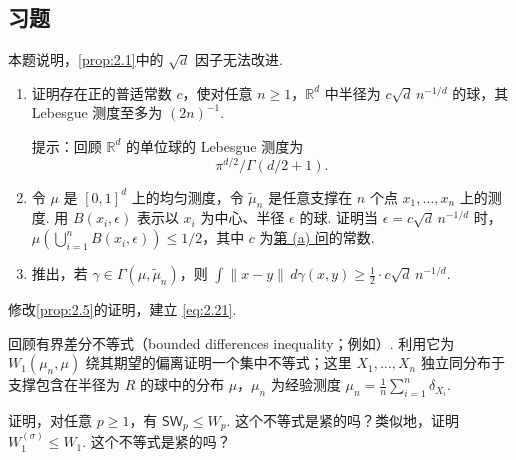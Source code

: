 \subsection{习题}\label{sec:2.10}
\begin{exercise}\label{exer:2.1}
本题说明，\autoref{prop:2.1}中的 $\sqrt d$ 因子无法改进.
\begin{enumerate}
\item[(a)]\label{item:2.1a} 证明存在正的普适常数 $c$，使对任意 $n\ge1$，$\mathbb R^d$ 中半径为 $c\sqrt d\,n^{-1/d}$ 的球，其 Lebesgue 测度至多为 $(2n)^{-1}$.
\par 提示：回顾 $\mathbb R^d$ 的单位球的 Lebesgue 测度为
$$\pi^{d/2}/\Gamma(d/2+1).$$
\item[(b)] 令 $\mu$ 是 $[0,1]^d$ 上的均匀测度，令 $\tilde\mu_n$ 是任意支撑在 $n$ 个点 $x_1,\ldots,x_n$ 上的测度. 用 $B(x_i,\epsilon)$ 表示以 $x_i$ 为中心、半径 $\epsilon$ 的球. 证明当 $\epsilon=c\sqrt d\,n^{-1/d}$ 时，$\mu(\bigcup_{i=1}^nB(x_i,\epsilon))\le1/2$，其中 $c$ 为\hyperref[item:2.1a]{第 (a) 问}的常数.
\item[(c)] 推出，若 $\gamma\in\Gamma(\mu,\tilde\mu_n)$，则 $\int\lVert x-y\rVert\,d\gamma(x,y)\ge\frac12\cdot c\sqrt d\,n^{-1/d}$.
\end{enumerate}
\end{exercise}

\begin{exercise}\label{exer:2.2}
修改\autoref{prop:2.5}的证明，建立 \eqref{eq:2.21}.
\end{exercise}

\begin{exercise}\label{exer:2.3}
回顾有界差分不等式（bounded differences inequality；例如\cite[定理6.2]{ref51}）. 利用它为 $W_1(\mu_n,\mu)$ 绕其期望的偏离证明一个集中不等式；这里 $X_1,\ldots,X_n$ 独立同分布于支撑包含在半径为 $R$ 的球中的分布 $\mu$，$\mu_n$ 为经验测度 $\mu_n=\frac1n\sum_{i=1}^n\delta_{X_i}$.
\end{exercise}

\begin{exercise}\label{exer:2.4}
证明，对任意 $p\ge1$，有 $\mathsf{SW}_p\le W_p$. 这个不等式是紧的吗？类似地，证明 $W_1^{(\sigma)}\le W_1$. 这个不等式是紧的吗？
\end{exercise}


